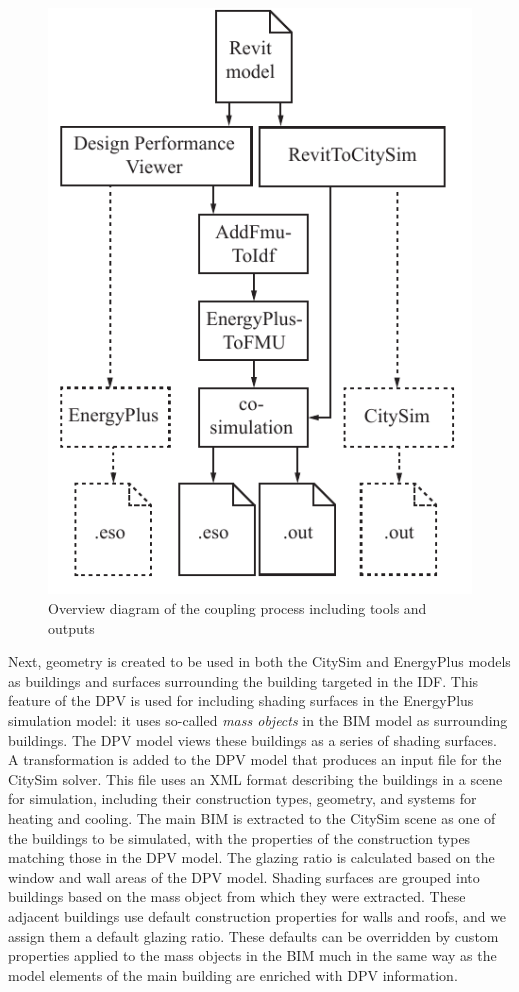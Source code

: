 \documentclass{tBPS2e}
\theoremstyle{plain}
\theoremstyle{definition}
\theoremstyle{remark}
\begin{document}
\begin{figure}[H]
\centering
\includegraphics[scale=0.7]{figures/UMEM_Workflow}
\caption{Overview diagram of the coupling process including tools and outputs \citep{thomas_multiscale_2014}}
\label{fig:OverallWorkflowProcess}
\end{figure}

Next, geometry is created to be used in both the CitySim and EnergyPlus models
as buildings and surfaces surrounding the building targeted in the IDF. This
feature of the DPV is used for including shading surfaces in the EnergyPlus
simulation model: it uses so-called \emph{mass objects} in the BIM model as
surrounding buildings. The DPV model views these buildings as a series of
shading surfaces. A transformation is added to the DPV model that produces an
input file for the CitySim solver. This file uses an XML format describing the
buildings in a scene for simulation, including their construction types,
geometry, and systems for heating and cooling. The main BIM is extracted to the
CitySim scene as one of the buildings to be simulated, with the properties of
the construction types matching those in the DPV model. The glazing ratio is
calculated based on the window and wall areas of the DPV model. Shading
surfaces are grouped into buildings based on the mass object from which they were extracted. 
These adjacent buildings use default construction properties for walls and roofs, 
and we assign them a default glazing ratio. These defaults can be overridden by custom 
properties applied to the mass objects in the BIM much in the same way as the model elements of the main
building are enriched with DPV information.
\end{document}
